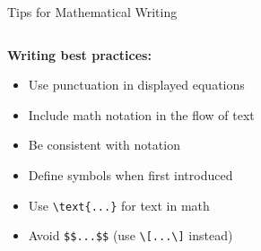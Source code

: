 \begin{frame}[fragile]{Tips for Mathematical Writing}
\begin{columns}
\begin{column}{0.5\textwidth}
                    \textbf{Writing best practices:}
                    \begin{itemize}
                         \item Use punctuation in displayed equations
                         \item Include math notation in the flow of text
                         \item Be consistent with notation
                         \item Define symbols when first introduced
                         \item Use \texttt{\textbackslash text\{...\}} for text in math
                         \item Avoid \texttt{\$\$...\$\$} (use \texttt{\textbackslash[...\textbackslash]} instead)
                    \end{itemize}
               \end{column}
          \end{columns}
     \end{frame}
     
